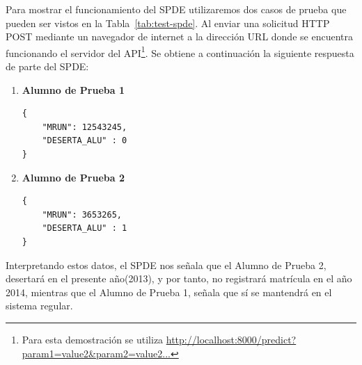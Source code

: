 Para mostrar el funcionamiento del SPDE utilizaremos dos casos de prueba que pueden ser vistos en la Tabla~\ref{tab:test-spde}. Al enviar una solicitud HTTP POST mediante un navegador de internet a la dirección URL donde se encuentra funcionando el servidor del API\footnote{Para esta demostración se utiliza \url{http://localhost:8000/predict?param1=value2&param2=value2...}}.
Se obtiene a continuación la siguiente respuesta de parte del SPDE:
\begin{enumerate}
\item  \textbf{Alumno de Prueba 1} \\ \hfill
\begin{verbatim}
{     
    "MRUN": 12543245,
    "DESERTA_ALU" : 0
}
\end{verbatim}
\item  \textbf{Alumno de Prueba 2} \\ \hfill
\begin{verbatim}
{     
    "MRUN": 3653265,
    "DESERTA_ALU" : 1
}
\end{verbatim}
\end{enumerate}
Interpretando estos datos, el SPDE nos señala que el Alumno de Prueba 2, desertará en el presente año(2013), y por tanto, no registrará matrícula en el año 2014, mientras que el Alumno de Prueba 1, señala que sí se mantendrá en el sistema regular.

